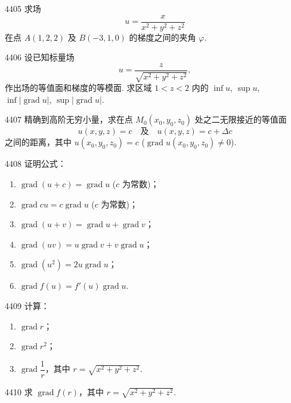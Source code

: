 \begin{prob}[M]{4405}
求场
\[
u = \frac{x}{x^2 + y^2 + z^2}
\]
在点 $A(1, 2, 2)$ 及 $B(-3, 1, 0)$ 的梯度之间的夹角 $\varphi$.
\end{prob}

\begin{prob}[M]{4406}
设已知标量场
\[
u = \frac{z}{\sqrt{x^2 + y^2 + z^2}},
\]
作出场的等值面和梯度的等模面.
求区域 $1 < z < 2$ 内的 $\inf u$, $\sup u$, $\inf |\operatorname{grad} u|$, $\sup |\operatorname{grad} u|$.
\end{prob}

\begin{prob}[M]{4407}
精确到高阶无穷小量，求在点 $M_0(x_0, y_0, z_0)$ 处之二无限接近的等值面
\[
u(x, y, z) = c \quad \text{及} \quad u(x, y, z) = c + \Delta c
\]
之间的距离，其中 $u(x_0, y_0, z_0) = c$ ($\operatorname{grad} u(x_0, y_0, z_0) \neq 0$).
\end{prob}

\begin{prob}[L]{4408}
证明公式：
\begin{enumerate}[label=(\alph*), itemsep=2pt, topsep=3pt]
  \item $\operatorname{grad}(u + c) = \operatorname{grad} u$ ($c$ 为常数)；
  \item $\operatorname{grad} cu = c \operatorname{grad} u$ ($c$ 为常数)；
  \item $\operatorname{grad}(u + v) = \operatorname{grad} u + \operatorname{grad} v$；
  \item $\operatorname{grad}(uv) = u \operatorname{grad} v + v \operatorname{grad} u$；
  \item $\operatorname{grad}(u^2) = 2u \operatorname{grad} u$；
  \item $\operatorname{grad} f(u) = f'(u) \operatorname{grad} u$.
\end{enumerate}
\end{prob}

\begin{prob}[L]{4409}
计算：
\begin{enumerate}[label=(\alph*), itemsep=2pt, topsep=3pt]
  \item $\operatorname{grad} r$；
  \item $\operatorname{grad} r^2$；
  \item $\operatorname{grad} \dfrac{1}{r}$，其中 $r = \sqrt{x^2 + y^2 + z^2}$.
\end{enumerate}
\end{prob}

\begin{prob}[S]{4410}
求 $\operatorname{grad} f(r)$，其中 $r = \sqrt{x^2 + y^2 + z^2}$.
\end{prob}

